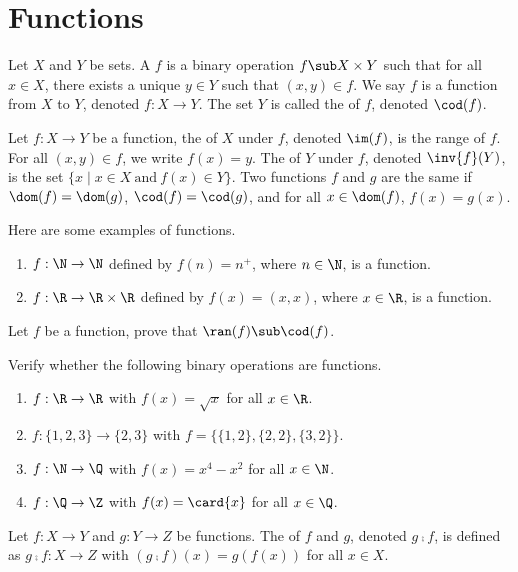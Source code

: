 \documentclass[10pt]{article}
\begin{document}
\section{Functions}
\begin{definition}
    Let $X$ and $Y$ be sets. A  $f$ is a binary operation $f\sub X\times Y$ such that for all $x\in X$, there exists a unique $y\in Y$ such that $(x,y)\in f$. We say $f$ is a function from $X$ to $Y$, denoted $f:X\to Y$. The set $Y$ is called the  of $f$, denoted $\cod(f)$.
\end{definition}
\begin{definition}
    Let $f:X\to Y$ be a function, the  of $X$ under $f$, denoted $\im(f)$, is the range of $f$. For all $(x,y)\in f$, we write $f(x)=y$. The  of $Y$ under $f$, denoted $\inv{f}(Y)$, is the set $\{x\mid x\in X\ \text{and}\ f(x)\in Y\}$. Two functions $f$ and $g$ are the same if $\dom(f)=\dom(g)$, $\cod(f)=\cod(g)$, and for all $x\in\dom(f)$, $f(x)=g(x)$.
\end{definition}
\begin{example}
    Here are some examples of functions.
    \begin{enumerate}
        \item $f:\N\to\N$ defined by $f(n)={n}^{+}$, where $n\in\N$, is a function.
        \item $f:\R\to\R\times\R$ defined by $f(x)=(x,x)$, where $x\in\R$, is a function.
    \end{enumerate}
\end{example}
\begin{problem}
    Let $f$ be a function, prove that $\ran(f)\sub\cod(f)$.
\end{problem}
\begin{problem}
    Verify whether the following binary operations are functions.
    \begin{enumerate}
        \item $f:\R\to\R$ with $f(x)=\sqrt{x}$ for all $x\in\R$.
        \item $f:\{1,2,3\}\to\{2,3\}$ with $f=\{\{1,2\},\{2,2\},\{3,2\}\}$.
        \item $f:\N\to\Q$ with $f(x)={x}^{4}-{x}^{2}$ for all $x\in\N$.
        \item $f:\Q\to\Z$ with $f(x)=\card{x}$ for all $x\in\Q$.
    \end{enumerate}
\end{problem}
\begin{definition}
    Let $f:X\to Y$ and $g:Y\to Z$ be functions. The  of $f$ and $g$, denoted $g\comp f$, is defined as $g\comp f:X\to Z$ with $(g\comp f)(x)=g(f(x))$ for all $x\in X$.
\end{definition}
\end{document}
